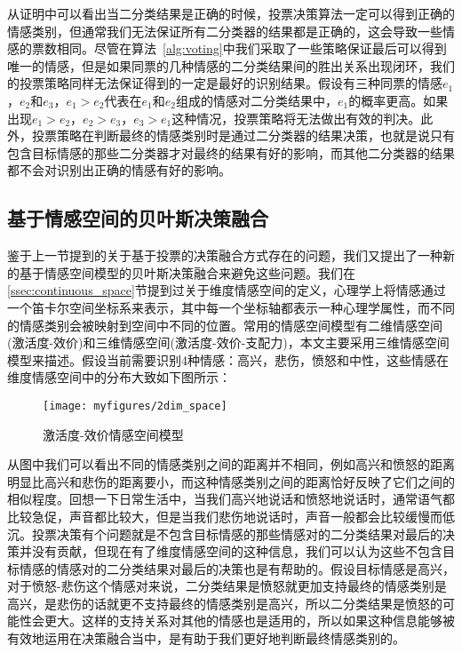 从证明中可以看出当二分类结果是正确的时候，投票决策算法一定可以得到正确的情感类别，但通常我们无法保证所有二分类器的结果都是正确的，这会导致一些情感的票数相同。尽管在算法~\ref{alg:voting}中我们采取了一些策略保证最后可以得到唯一的情感，但是如果同票的几种情感的二分类结果间的胜出关系出现闭环，我们的投票策略同样无法保证得到的一定是最好的识别结果。假设有三种同票的情感$e_1$，$e_2$和$e_3$，$e_1>e_2$代表在$e_1$和$e_2$组成的情感对二分类结果中，$e_1$的概率更高。如果出现$e_1>e_2$，$e_2>e_3$，$e_3>e_1$这种情况，投票策略将无法做出有效的判决。此外，投票策略在判断最终的情感类别时是通过二分类器的结果决策，也就是说只有包含目标情感的那些二分类器才对最终的结果有好的影响，而其他二分类器的结果都不会对识别出正确的情感有好的影响。

\subsection{基于情感空间的贝叶斯决策融合}
\label{emo_space_decision_fusion}
鉴于上一节提到的关于基于投票的决策融合方式存在的问题，我们又提出了一种新的基于情感空间模型的贝叶斯决策融合来避免这些问题。我们在\ref{ssec:continuous_space}节提到过关于维度情感空间的定义，心理学上将情感通过一个笛卡尔空间坐标系来表示，其中每一个坐标轴都表示一种心理学属性，而不同的情感类别会被映射到空间中不同的位置。常用的情感空间模型有二维情感空间(激活度-效价)和三维情感空间(激活度-效价-支配力)，本文主要采用三维情感空间模型来描述。假设当前需要识别4种情感：高兴，悲伤，愤怒和中性，这些情感在维度情感空间中的分布大致如下图所示：

\begin{figure}[H] %
    \centering
    \texttt{[image: myfigures/2dim\_space]}
    \caption{激活度-效价情感空间模型}
    \label{fig:xfig1}
\end{figure}

从图中我们可以看出不同的情感类别之间的距离并不相同，例如高兴和愤怒的距离明显比高兴和悲伤的距离要小，而这种情感类别之间的距离恰好反映了它们之间的相似程度。回想一下日常生活中，当我们高兴地说话和愤怒地说话时，通常语气都比较急促，声音都比较大，但是当我们悲伤地说话时，声音一般都会比较缓慢而低沉。投票决策有个问题就是不包含目标情感的那些情感对的二分类结果对最后的决策并没有贡献，但现在有了维度情感空间的这种信息，我们可以认为这些不包含目标情感的情感对的二分类结果对最后的决策也是有帮助的。假设目标情感是高兴，对于愤怒-悲伤这个情感对来说，二分类结果是愤怒就更加支持最终的情感类别是高兴，是悲伤的话就更不支持最终的情感类别是高兴，所以二分类结果是愤怒的可能性会更大。这样的支持关系对其他的情感也是适用的，所以如果这种信息能够被有效地运用在决策融合当中，是有助于我们更好地判断最终情感类别的。

